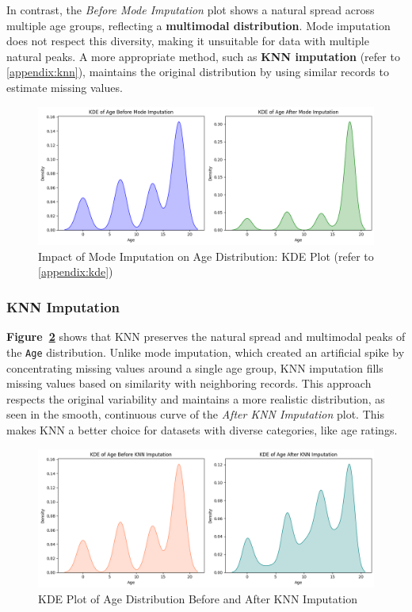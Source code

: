 \documentclass[a4paper, 12pt]{article}
\begin{document}
In contrast, the \textit{Before Mode Imputation} plot shows a natural spread across multiple age groups, reflecting a \textbf{multimodal distribution}. Mode imputation does not respect this diversity, making it unsuitable for data with multiple natural peaks. A more appropriate method, such as \textbf{KNN imputation} (refer to \autoref{appendix:knn}), maintains the original distribution by using similar records to estimate missing values.

\begin{figure}[H]
    \centering
    \includegraphics[width=\textwidth]{mode.png} %
    \caption{Impact of Mode Imputation on Age Distribution: KDE Plot (refer to \autoref{appendix:kde})}
    \label{fig:mode_imputation}
\end{figure}

\subsubsection{KNN Imputation}

\textbf{Figure~\ref{fig:knn_imputation}} shows that KNN preserves the natural spread and multimodal peaks of the \texttt{Age} distribution. Unlike mode imputation, which created an artificial spike by concentrating missing values around a single age group, KNN imputation fills missing values based on similarity with neighboring records. This approach respects the original variability and maintains a more realistic distribution, as seen in the smooth, continuous curve of the \textit{After KNN Imputation} plot. This makes KNN a better choice for datasets with diverse categories, like age ratings.

\begin{figure}[H]
    \centering
    \includegraphics[width=\textwidth]{knn.png} %
    \caption{KDE Plot of Age Distribution Before and After KNN Imputation}
    \label{fig:knn_imputation}
\end{figure}
\end{document}
